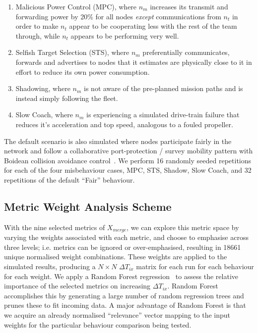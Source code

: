 \documentclass[conference]{IEEEtran}
\begin{document}
\begin{enumerate}
	\item Malicious Power Control (MPC), where $n_m$ increases its transmit and forwarding power by 20\% for all nodes \emph{except} communications from $n_t$ in order to make $n_t$ appear to be cooperating less with the rest of the team through, while $n_t$ appears to be performing very well.
	\item Selfish Target Selection (STS), where $n_m$ preferentially communicates, forwards and advertises to nodes that it estimates are physically close to it in effort to reduce its own power consumption.
	\item Shadowing, where $n_m$ is not aware of the pre-planned mission paths and is instead simply following the fleet.
	\item Slow Coach, where $n_m$ is experiencing a simulated drive-train failure that reduces it's acceleration and top speed, analogous to a fouled propeller. 
\end{enumerate}

The default scenario is also simulated where nodes participate fairly in the network and follow a collaborative port-protection / survey mobility pattern with Boidean collision avoidance control~\cite{Reynolds1987a}.
We perform 16 randomly seeded repetitions for each of the four misbehaviour cases, MPC, STS, Shadow, Slow Coach, and 32 repetitions of the default ``Fair'' behaviour.



\subsection{Metric Weight Analysis Scheme}

With the nine selected metrics of $X_{merge}$, we can explore this metric space by varying the weights associated with each metric, and choose to emphasise across three levels; i.e. metrics can be ignored or over-emphasised, resulting in 18661 unique normalised weight combinations.
These weights are applied to the simulated results, producing a $N\times N$ $\Delta T_{ix}$ matrix for each run for each behaviour for each weight.
We apply a Random Forest regression~\cite{Breiman2001} to assess the relative importance of the selected metrics on increasing $\Delta  T_{ix}$. 
Random Forest accomplishes this by generating a large number of random regression trees and prunes these to fit incoming data. 
A major advantage of Random Forest is that we acquire an already normalised ``relevance'' vector mapping to the input weights for the particular behaviour comparison being tested.
\end{document}
